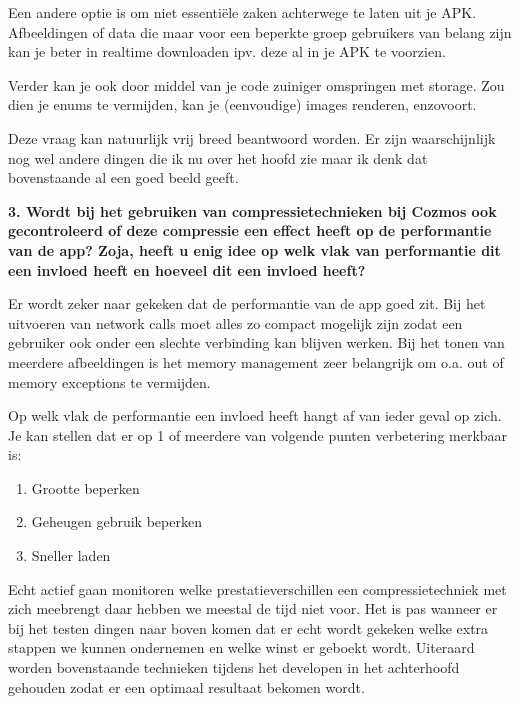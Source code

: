 \begin{appendices}
	Een andere optie is om niet essentiële zaken achterwege te laten uit je APK. Afbeeldingen of data die maar voor een beperkte groep gebruikers van belang zijn kan je beter in realtime downloaden ipv. deze al in je APK te voorzien.
	
	Verder kan je ook door middel van je code zuiniger omspringen met storage. Zou dien je enums te vermijden, kan je (eenvoudige) images renderen, enzovoort. 
	
	Deze vraag kan natuurlijk vrij breed beantwoord worden. Er zijn waarschijnlijk nog wel andere dingen die ik nu over het hoofd zie maar ik denk dat bovenstaande al een goed beeld geeft. 
	
	\textbf{3. Wordt bij het gebruiken van compressietechnieken bij Cozmos ook gecontroleerd of deze compressie een effect heeft op de performantie van de app? Zoja, heeft u enig idee op welk vlak van performantie dit een invloed heeft en hoeveel dit een invloed heeft?}
	
	Er wordt zeker naar gekeken dat de performantie van de app goed zit. Bij het uitvoeren van network calls moet alles zo compact mogelijk zijn zodat een gebruiker ook onder een slechte verbinding kan blijven werken. Bij het tonen van meerdere afbeeldingen is het memory management zeer belangrijk om o.a. out of memory exceptions te vermijden. 
	
	Op welk vlak de performantie een invloed heeft hangt af van ieder geval op zich. Je kan stellen dat er op 1 of meerdere van volgende punten verbetering merkbaar is:
	\begin{enumerate}
		\item Grootte beperken
		\item Geheugen gebruik beperken
		\item Sneller laden
	\end{enumerate}
	
	Echt actief gaan monitoren welke prestatieverschillen een compressietechniek met zich meebrengt  daar hebben we meestal de tijd niet voor. Het is pas wanneer er bij het testen dingen naar boven komen dat er echt wordt gekeken welke extra stappen we kunnen ondernemen en welke winst er geboekt wordt. Uiteraard worden bovenstaande technieken tijdens het developen in het achterhoofd gehouden zodat er een optimaal resultaat bekomen wordt.
	
\end{appendices}


